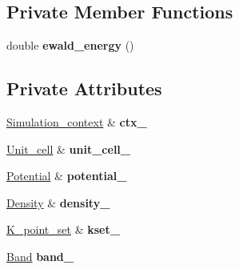 \subsection*{Private Member Functions}
\begin{DoxyCompactItemize}
\item 
\hypertarget{classsirius_1_1_d_f_t__ground__state_af4ba0c4e7d2cae0611052e68e8f5bf93}{}double {\bfseries ewald\+\_\+energy} ()\label{classsirius_1_1_d_f_t__ground__state_af4ba0c4e7d2cae0611052e68e8f5bf93}

\end{DoxyCompactItemize}
\subsection*{Private Attributes}
\begin{DoxyCompactItemize}
\item 
\hypertarget{classsirius_1_1_d_f_t__ground__state_a44876b51bc01d0992b92925d945cabe7}{}\hyperlink{classsirius_1_1_simulation__context}{Simulation\+\_\+context} \& {\bfseries ctx\+\_\+}\label{classsirius_1_1_d_f_t__ground__state_a44876b51bc01d0992b92925d945cabe7}

\item 
\hypertarget{classsirius_1_1_d_f_t__ground__state_ad79a6a76e8fd25e67b53d5e93e060637}{}\hyperlink{classsirius_1_1_unit__cell}{Unit\+\_\+cell} \& {\bfseries unit\+\_\+cell\+\_\+}\label{classsirius_1_1_d_f_t__ground__state_ad79a6a76e8fd25e67b53d5e93e060637}

\item 
\hypertarget{classsirius_1_1_d_f_t__ground__state_a969332931b32cf3487a486094437bac8}{}\hyperlink{classsirius_1_1_potential}{Potential} \& {\bfseries potential\+\_\+}\label{classsirius_1_1_d_f_t__ground__state_a969332931b32cf3487a486094437bac8}

\item 
\hypertarget{classsirius_1_1_d_f_t__ground__state_a2ffe2aef59e66e2c3fd64e7d80e39527}{}\hyperlink{classsirius_1_1_density}{Density} \& {\bfseries density\+\_\+}\label{classsirius_1_1_d_f_t__ground__state_a2ffe2aef59e66e2c3fd64e7d80e39527}

\item 
\hypertarget{classsirius_1_1_d_f_t__ground__state_a618ceb051aaf4a9b7b3a5bd184ee505d}{}\hyperlink{classsirius_1_1_k__point__set}{K\+\_\+point\+\_\+set} \& {\bfseries kset\+\_\+}\label{classsirius_1_1_d_f_t__ground__state_a618ceb051aaf4a9b7b3a5bd184ee505d}

\item 
\hypertarget{classsirius_1_1_d_f_t__ground__state_ac425fae262f0dbdebb83fdb820215d93}{}\hyperlink{classsirius_1_1_band}{Band} {\bfseries band\+\_\+}\label{classsirius_1_1_d_f_t__ground__state_ac425fae262f0dbdebb83fdb820215d93}


\end{DoxyCompactItemize}
